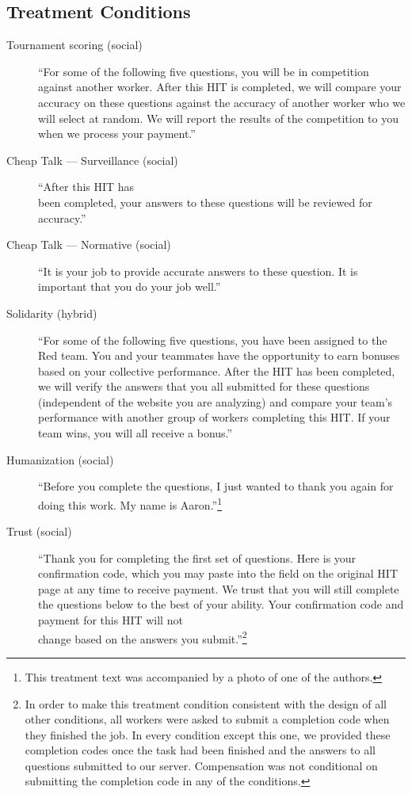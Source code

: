 \documentclass{cscw2010}
\begin{document}
\subsection{Treatment Conditions}

\begin{description}
\item[Tournament scoring (social)] ``For some of the following five questions, you will be in competition against another worker. After this HIT is completed, we will compare your accuracy on these questions against the accuracy of another worker who we will select at random. We will report the results of the competition to you when we process your payment.''%

\item[Cheap Talk --- Surveillance (social)] ``After this HIT has\\ been
  completed, your answers to these questions will be reviewed for
  accuracy.'' %
\item[Cheap Talk --- Normative (social)] ``It is your job to provide
  accurate answers to these question. It is important that you do your
  job well.'' %
\item[Solidarity (hybrid)] ``For some of the following five questions,
  you have been assigned to the Red team. You and your teammates have
  the opportunity to earn bonuses based on your collective
  performance. After the HIT has been completed, we will verify the
  answers that you all submitted for these questions (independent of
  the website you are analyzing) and compare your team's performance
  with another group of workers completing this HIT. If your team
  wins, you will all receive a bonus.'' %
\item[Humanization (social)] ``Before you complete the questions, I
  just wanted to thank you again for doing this work. My name is
  Aaron.''\footnote{This treatment text was accompanied by a photo of one of the authors.} %
\item[Trust (social)] ``Thank you for completing the first set of
  questions. Here is your confirmation code, which you may paste into
  the field on the original HIT page at any time to receive
  payment. We trust that you will still complete the questions below
  to the best of your ability. Your confirmation code and payment for
  this HIT will not \\change based on the answers you
  submit.''\footnote{In order to make this treatment condition consistent with the design of all other conditions, all workers were asked to submit a completion code when they finished the job. In every condition except this one, we provided these completion codes once the task had been finished and the answers to all questions submitted to our server. Compensation was not conditional on submitting the completion code in any of the conditions.}

\end{description}
\end{document}
